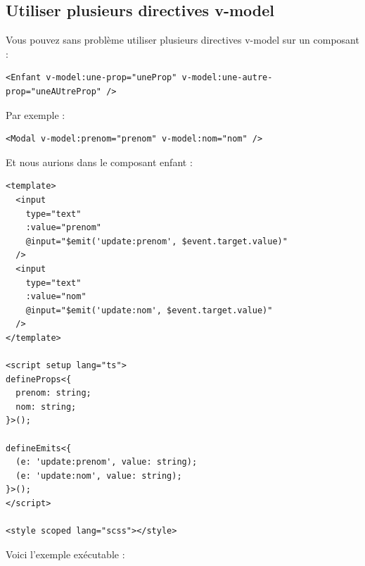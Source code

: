 \documentclass{article}
\begin{document}
\subsection{Utiliser plusieurs directives {\color{monOrange}v-model}}
Vous pouvez sans problème utiliser plusieurs directives v-model sur un composant :
\begin{verbatim}
<Enfant v-model:une-prop="uneProp" v-model:une-autre-prop="uneAUtreProp" />
\end{verbatim}
Par exemple :
\begin{verbatim}
<Modal v-model:prenom="prenom" v-model:nom="nom" />
\end{verbatim}
Et nous aurions dans le composant enfant :
\begin{verbatim}
<template>
  <input
    type="text"
    :value="prenom"
    @input="$emit('update:prenom', $event.target.value)"
  />
  <input
    type="text"
    :value="nom"
    @input="$emit('update:nom', $event.target.value)"
  />
</template>

<script setup lang="ts">
defineProps<{
  prenom: string;
  nom: string;
}>();

defineEmits<{
  (e: 'update:prenom', value: string);
  (e: 'update:nom', value: string);
}>();
</script>

<style scoped lang="scss"></style>
\end{verbatim}
Voici l'exemple exécutable :
\end{document}
